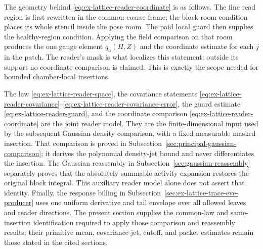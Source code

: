 The geometry behind \eqref{eq:ex-lattice-reader-coordinate} is as follows. The fine read region is first
rewritten in the common coarse frame; the block room condition places its
whole stencil inside the pose room. The paid local guard then supplies the
healthy-region condition. Applying the field comparison on that room
produces the one gauge element $q_a(H,Z)$ and the coordinate estimate for
each $j$ in the patch. The reader's mask is what localizes this statement:
outside its support no coordinate comparison is claimed. This is exactly
the scope needed for bounded chamber-local insertions.

The law \eqref{eq:ex-lattice-reader-space}, the covariance statements
\eqref{eq:ex-lattice-reader-covariance}--\eqref{eq:ex-lattice-reader-covariance-error},
the guard estimate \eqref{eq:ex-lattice-reader-guard}, and the coordinate
comparison \eqref{eq:ex-lattice-reader-coordinate} are the joint reader model. They are the
finite-dimensional input used by the subsequent Gaussian density
comparison, with a fixed measurable masked insertion. That comparison is
proved in Subsection~\ref{sec:principal-gaussian-comparison}; it derives the
polynomial density-jet bound and never differentiates the insertion. The
Gaussian reassembly in Subsection~\ref{sec:gaussian-reassembly} separately
proves that the absolutely summable activity expansion restores the
original block integral. This auxiliary reader model alone does not assert
that identity. Finally, the response billing in
Subsection~\ref{sec:ex-lattice-trace-eve-producer} uses one uniform derivative
and tail envelope over all allowed leaves and reader directions. The
present section supplies the common-law and same-insertion identification
required to apply those comparison and reassembly results; their primitive
mean, covariance-jet, cutoff, and packet estimates remain those stated in
the cited sections.
